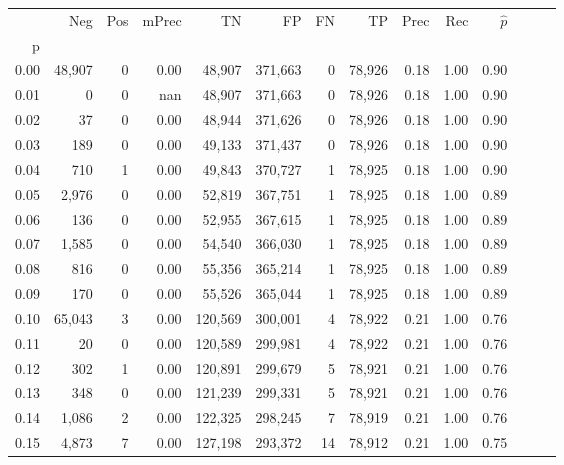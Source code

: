 \begin{tabular}{rrrrrrrrrrrrrr}
\toprule
{} &     Neg &     Pos & mPrec &       TN &       FP &      FN &      TP &  Prec &   Rec & $\hat{p}$ \\
p    &         &         &       &          &          &         &         &       &       &           \\
\midrule
0.00 &  48,907 &       0 &  0.00 &   48,907 &  371,663 &       0 &  78,926 &  0.18 &  1.00 &      0.90 \\
0.01 &       0 &       0 &   nan &   48,907 &  371,663 &       0 &  78,926 &  0.18 &  1.00 &      0.90 \\
0.02 &      37 &       0 &  0.00 &   48,944 &  371,626 &       0 &  78,926 &  0.18 &  1.00 &      0.90 \\
0.03 &     189 &       0 &  0.00 &   49,133 &  371,437 &       0 &  78,926 &  0.18 &  1.00 &      0.90 \\
0.04 &     710 &       1 &  0.00 &   49,843 &  370,727 &       1 &  78,925 &  0.18 &  1.00 &      0.90 \\
0.05 &   2,976 &       0 &  0.00 &   52,819 &  367,751 &       1 &  78,925 &  0.18 &  1.00 &      0.89 \\
0.06 &     136 &       0 &  0.00 &   52,955 &  367,615 &       1 &  78,925 &  0.18 &  1.00 &      0.89 \\
0.07 &   1,585 &       0 &  0.00 &   54,540 &  366,030 &       1 &  78,925 &  0.18 &  1.00 &      0.89 \\
0.08 &     816 &       0 &  0.00 &   55,356 &  365,214 &       1 &  78,925 &  0.18 &  1.00 &      0.89 \\
0.09 &     170 &       0 &  0.00 &   55,526 &  365,044 &       1 &  78,925 &  0.18 &  1.00 &      0.89 \\
0.10 &  65,043 &       3 &  0.00 &  120,569 &  300,001 &       4 &  78,922 &  0.21 &  1.00 &      0.76 \\
0.11 &      20 &       0 &  0.00 &  120,589 &  299,981 &       4 &  78,922 &  0.21 &  1.00 &      0.76 \\
0.12 &     302 &       1 &  0.00 &  120,891 &  299,679 &       5 &  78,921 &  0.21 &  1.00 &      0.76 \\
0.13 &     348 &       0 &  0.00 &  121,239 &  299,331 &       5 &  78,921 &  0.21 &  1.00 &      0.76 \\
0.14 &   1,086 &       2 &  0.00 &  122,325 &  298,245 &       7 &  78,919 &  0.21 &  1.00 &      0.76 \\
0.15 &   4,873 &       7 &  0.00 &  127,198 &  293,372 &      14 &  78,912 &  0.21 &  1.00 &      0.75 \\

\end{tabular}
